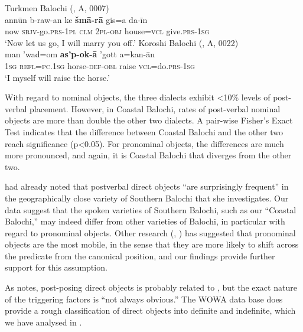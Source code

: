 \documentclass[output=paper,colorlinks,citecolor=brown,draftmode]{langscibook}
\begin{document}
\ea\label{Balochi:ex:12}
\ea\label{Balochi:ex:12a}
Turkmen Balochi (\citealt{haig_balochi_2022}, A, 0007)\\
\gll annūn b-raw-an ke \textbf{šmā-rā} gis=a da-īn \\
now \textsc{sbjv}-go.\textsc{prs}-\textsc{1pl} \textsc{clm} \textsc{2pl}-\textsc{obj} house=\textsc{vcl} give.\textsc{prs}-\textsc{1sg} \\
\glt `{N}ow let us go, I will marry you off.'
\ex\label{Balochi:ex:12b}
Koroshi Balochi (\citealt{nourzaei_balochi_koroshi_2021}, A, 0022)\\
\gll man 'wad=om \textbf{as'p-ok-ā} 'gott a=kan-ān \\
\textsc{1sg} \textsc{refl}=\textsc{pc}.\textsc{1sg} horse-\textsc{def}-\textsc{obl} raise \textsc{vcl}=do.\textsc{prs}-\textsc{1sg} \\
\glt `I myself will raise the horse.'
\z
\z

With regard to nominal objects, the three dialects exhibit <10\% levels of post-verbal placement. However, in Coastal Balochi, rates of post-verbal nominal objects are more than double the other two dialects. A pair-wise Fisher's Exact Test indicates that the difference between Coastal Balochi and the other two reach significance (p<0.05). For pronominal objects, the differences are much more pronounced, and again, it is Coastal Balochi that diverges from the other two.

\citet[112]{Korn2022Targets} had already noted that postverbal direct objects ``are surprisingly frequent'' in the geographically close variety of Southern Balochi that she investigates. Our data suggest that the spoken varieties of Southern Balochi, such as our ``Coastal  Balochi,'' may indeed differ from other varieties of Balochi, in particular with regard to pronominal objects. Other research (\citealt{stilo_preverbal_2018}, \citealt{haig_which_2023}) has suggested that pronominal objects are the most mobile, in the sense that they are more likely to shift across the predicate from the canonical  position, and our findings provide further support for this assumption. 

As \citet[113]{Korn2022Targets} notes, post-posing direct objects is probably related to , but the exact nature of the triggering factors is ``not always obvious.'' The WOWA data base does provide a rough classification of direct objects into definite and indefinite, which we have analysed in .
\end{document}
